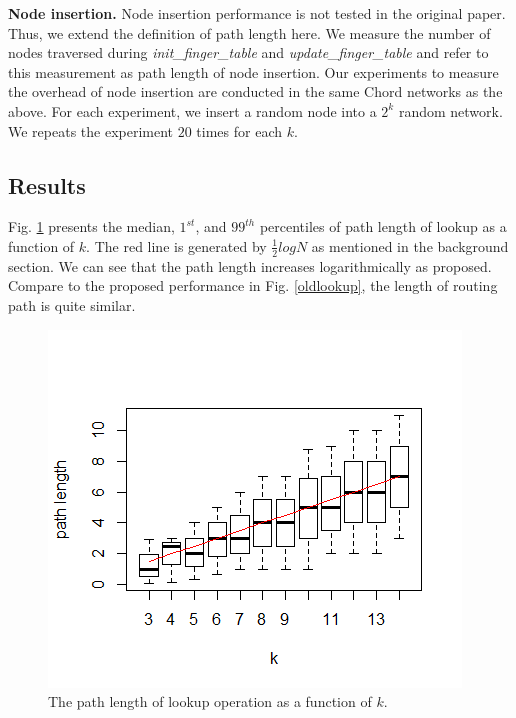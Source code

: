 \documentclass{article}
\begin{document}
\textbf{Node insertion.} Node insertion performance is not tested in the original paper. Thus, we extend the definition of path length here. We measure the number of nodes traversed during \textit{init\_finger\_table} and \textit{update\_finger\_table} and refer to this measurement as path length of node insertion. Our experiments to measure the overhead of node insertion are conducted in the same Chord networks as the above. For each experiment, we insert a random node into a $2^k$ random network. We repeats the experiment $20$ times for each $k$.

\subsection*{Results}
Fig. \ref{lookup} presents the median, $1^{st}$, and $99^{th}$ percentiles of path length of lookup as a function of $k$. The red line is generated by $\frac{1}{2}logN$ as mentioned in the background section. We can see that the path length increases logarithmically as proposed. Compare to the proposed performance in Fig. \ref{oldlookup}, the length of routing path is quite similar. 
\begin{figure}[H]
\centering
\includegraphics[scale=1]{lookup.png}
\caption{The path length of lookup operation as a function of $k$.
\label{lookup}}
\end{figure}
\end{document}
